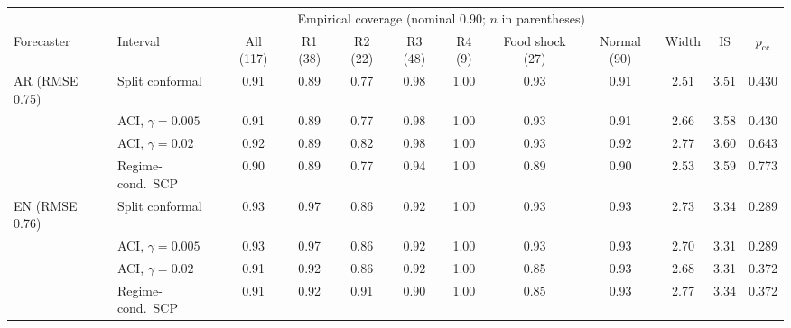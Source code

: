 \begin{tabular}{llcccccccccc}
\toprule
 & & \multicolumn{7}{c}{Empirical coverage (nominal 0.90; $n$ in parentheses)} & & & \\
\cmidrule(lr){3-9}
Forecaster & Interval & All (117) & R1 (38) & R2 (22) & R3 (48) & R4 (9) & Food shock (27) & Normal (90) & Width & IS & $p_{\mathrm{cc}}$ \\
\midrule
AR (RMSE 0.75) & Split conformal & 0.91 & 0.89 & 0.77 & 0.98 & 1.00 & 0.93 & 0.91 & 2.51 & 3.51 & 0.430 \\
 & ACI, $\gamma=0.005$ & 0.91 & 0.89 & 0.77 & 0.98 & 1.00 & 0.93 & 0.91 & 2.66 & 3.58 & 0.430 \\
 & ACI, $\gamma=0.02$ & 0.92 & 0.89 & 0.82 & 0.98 & 1.00 & 0.93 & 0.92 & 2.77 & 3.60 & 0.643 \\
 & Regime-cond.\ SCP & 0.90 & 0.89 & 0.77 & 0.94 & 1.00 & 0.89 & 0.90 & 2.53 & 3.59 & 0.773 \\
\midrule
EN (RMSE 0.76) & Split conformal & 0.93 & 0.97 & 0.86 & 0.92 & 1.00 & 0.93 & 0.93 & 2.73 & 3.34 & 0.289 \\
 & ACI, $\gamma=0.005$ & 0.93 & 0.97 & 0.86 & 0.92 & 1.00 & 0.93 & 0.93 & 2.70 & 3.31 & 0.289 \\
 & ACI, $\gamma=0.02$ & 0.91 & 0.92 & 0.86 & 0.92 & 1.00 & 0.85 & 0.93 & 2.68 & 3.31 & 0.372 \\
 & Regime-cond.\ SCP & 0.91 & 0.92 & 0.91 & 0.90 & 1.00 & 0.85 & 0.93 & 2.77 & 3.34 & 0.372 \\
\bottomrule
\end{tabular}
